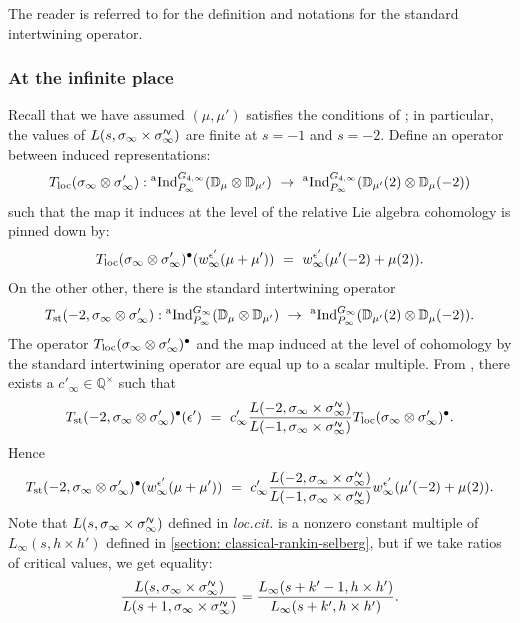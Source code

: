 \documentclass[11pt]{amsart}
\newcommand{\Q}{\mathbb Q}
\newcommand{\D}{\mathbb D}
\newcommand{\aInd}{{}^{\rm a}{\rm Ind}}
\newcommand{\sfv}{{\sf v}}
\begin{document}
The reader is referred to \cite[Sect.\,6.3.3]{harder-raghuram} for the definition and notations for the standard intertwining operator. 


\subsubsection{At the infinite place}
Recall that we have assumed $(\mu,\mu')$ satisfies the conditions of \cite[Lem.\,7.14]{harder-raghuram}; in particular, the values of 
$L(s, \sigma_\infty \times \sigma'^\sfv_\infty)$ are finite at $s = -1$ and $s = -2.$
Define an operator between induced representations:
$$T_{\textup{loc}}(\sigma_\infty \otimes \sigma'_\infty): 
\aInd_{P_\infty}^{G_{4,\infty}}(\D_\mu \otimes \D_{\mu'}) \ \rightarrow \ \aInd_{P_\infty}^{G_{4,\infty}}(\D_{\mu'}(2) \otimes \D_{\mu}(-2))
$$
such that the map it induces at the level of the relative Lie algebra cohomology is pinned down by:
$$
T_{\textup{\text{loc}}}(\sigma_\infty \otimes \sigma'_\infty)^\bullet (w^{\epsilon'}_{\infty}(\mu + \mu')) \ = \ w^{\epsilon'}_{\infty}(\mu'(-2) + \mu(2)).
$$
On the other other, there is the standard intertwining operator 
$$
T_{\rm st}(-2, \sigma_\infty \otimes \sigma'_\infty): 
\aInd_{P_\infty}^{G_\infty}(\D_\mu \otimes \D_{\mu'}) \ \rightarrow \ \aInd_{P_\infty}^{G_\infty}(\D_{\mu'}(2) \otimes \D_{\mu}(-2)).
$$
The operator $T_{\textup{\text{loc}}}(\sigma_\infty \otimes \sigma'_\infty)^\bullet$ 
and the map induced at the level of cohomology by the standard intertwining operator are equal up to a scalar multiple. 
From \cite[Thm.\,7.25]{harder-raghuram}, there exists a $c'_\infty \in \Q^\times$ such that
\begin{equation*}
	T_{\text{st}}(-2, \sigma_\infty \otimes \sigma'_\infty)^\bullet (\epsilon') \ = \ 
	c'_\infty \frac{L(-2, \sigma_\infty \times \sigma'^\sfv_\infty)}{L(-1, \sigma_\infty \times \sigma'^\sfv_\infty)} 
	T_{\textup{\text{loc}}}(\sigma_\infty \otimes \sigma'_\infty)^\bullet.
\end{equation*}
Hence
\begin{equation}
\label{eqn:T-st-on-basis}
	T_{\text{st}}(-2, \sigma_\infty \otimes \sigma'_\infty)^\bullet (w^{\epsilon'}_{\infty}(\mu + \mu')) \ = \ 
	c'_\infty 
	\frac{L(-2, \sigma_\infty \times \sigma'^\sfv_\infty)}{L(-1, \sigma_\infty \times \sigma'^\sfv_\infty)} 
	w^{\epsilon'}_{\infty}(\mu'(-2) + \mu(2)).
\end{equation}
Note that $L(s, \sigma_\infty \times \sigma_\infty'^\sfv)$ defined in \textit{loc.cit.} 
is a nonzero constant multiple of $L_\infty(s, h \times h')$ defined in \ref{section: classical-rankin-selberg}, but if we take ratios of critical values, we get equality: 
$$\frac{L(s, \sigma_\infty \times \sigma_\infty'^\sfv)}{L(s+1, \sigma_\infty \times \sigma_\infty'^\sfv)} = \frac{L_\infty(s+k'-1, h \times h')}{L_\infty(s+k', h \times h')}.$$
\end{document}

